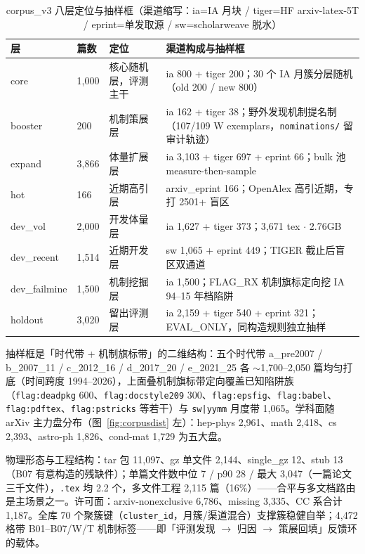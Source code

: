 \begin{table}[htbp]
\centering\small
\caption{corpus\_v3 八层定位与抽样框（渠道缩写：ia=IA 月块 / tiger=HF arxiv-latex-5T / eprint=单发取源 / sw=scholarweave 脱水）}
\label{tab:layers}
\begin{tabular}{@{}ll>{\raggedright\arraybackslash}p{3.4cm}>{\raggedright\arraybackslash}p{6.4cm}@{}}
\toprule
层 & 篇数 & 定位 & 渠道构成与抽样框 \\
\midrule
core & 1{,}000 & 核心随机层，评测主干 & ia 800 + tiger 200；30 个 IA 月簇分层随机（old 200 / new 800） \\
booster & 200 & 机制策展层 & ia 162 + tiger 38；野外发现机制提名制（107/109 W exemplars，\texttt{nominations/} 留审计轨迹） \\
expand & 3{,}866 & 体量扩展层 & ia 3{,}103 + tiger 697 + eprint 66；bulk 池 measure-then-sample \\
hot & 166 & 近期高引层 & arxiv\_eprint 166；OpenAlex 高引近期，专打 2501+ 盲区 \\
dev\_vol & 2{,}000 & 开发体量层 & ia 1{,}627 + tiger 373；3{,}671 tex $\cdot$ 2.76GB \\
dev\_recent & 1{,}514 & 近期开发层 & sw 1{,}065 + eprint 449；TIGER 截止后盲区双通道 \\
dev\_failmine & 1{,}500 & 机制挖掘层 & ia 1{,}500；FLAG\_RX 机制旗标定向挖 IA 94--15 年档陷阱 \\
holdout & 3{,}020 & 留出评测层 & ia 2{,}159 + tiger 540 + eprint 321；EVAL\_ONLY，同构造规则独立抽样 \\
\bottomrule
\end{tabular}
\end{table}

抽样框是「时代带 + 机制旗标带」的二维结构：五个时代带 a\_pre2007 / b\_2007\_11 / c\_2012\_16 / d\_2017\_20 / e\_2021\_25 各 $\sim$1{,}700--2{,}050 篇均匀打底（时间跨度 1994--2026），上面叠机制旗标带定向覆盖已知陷阱族（\texttt{flag:deadpkg} 600、\texttt{flag:docstyle209} 300、\texttt{flag:epsfig}、\texttt{flag:babel}、\texttt{flag:pdftex}、\texttt{flag:pstricks} 等若干）与 \texttt{sw|yymm} 月度带 1{,}065。学科面随 arXiv 主力盘分布（图~\ref{fig:corpusdist} 左）：hep-phys 2{,}961、math 2{,}418、cs 2{,}393、astro-ph 1{,}826、cond-mat 1{,}729 为五大盘。

物理形态与工程结构：tar 包 11{,}097、gz 单文件 2{,}144、single\_gz 12、stub 13（B07 有意构造的残缺件）；单篇文件数中位 7 / p90 28 / 最大 3{,}047（一篇论文三千文件），\texttt{.tex} 均 2.2 个，多文件工程 2{,}115 篇（16\%）——合平与多文档路由是主场景之一。许可面：arxiv-nonexclusive 6{,}786、missing 3{,}335、CC 系合计 1{,}187。全库 70 个聚簇键（\texttt{cluster\_id}，月簇/渠道混合）支撑簇稳健自举；4{,}472 格带 B01--B07/W/T 机制标签——即「评测发现 $\to$ 归因 $\to$ 策展回填」反馈环的载体。

